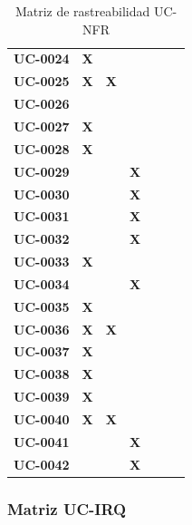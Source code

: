 \begin{table}[H]
\begin{tabular}{p{1.5cm}p{0.5cm}p{0.5cm}p{0.5cm}p{0.5cm}p{0.5cm}p{0.5cm}}
\textbf{UC-0024} & \textbf{X} &  &  &  &  &  \\
\textbf{UC-0025} & \textbf{X} & \textbf{X} &  &  &  &  \\
\textbf{UC-0026} &  &  &  &  &  &  \\
\textbf{UC-0027} & \textbf{X} &  &  &  &  &  \\
\textbf{UC-0028} & \textbf{X} &  &  &  &  &  \\
\textbf{UC-0029} &  &  & \textbf{X} &  &  &  \\
\textbf{UC-0030} &  &  & \textbf{X} &  &  &  \\
\textbf{UC-0031} &  &  & \textbf{X} &  &  &  \\
\textbf{UC-0032} &  &  & \textbf{X} &  &  &  \\
\textbf{UC-0033} & \textbf{X} &  &  &  &  &  \\
\textbf{UC-0034} &  &  & \textbf{X} &  &  &  \\
\textbf{UC-0035} & \textbf{X} &  &  &  &  &  \\
\textbf{UC-0036} & \textbf{X} & \textbf{X} &  &  &  &  \\
\textbf{UC-0037} & \textbf{X} &  &  &  &  &  \\
\textbf{UC-0038} & \textbf{X} &  &  &  &  &  \\
\textbf{UC-0039} & \textbf{X} &  &  &  &  &  \\
\textbf{UC-0040} & \textbf{X} & \textbf{X} &  &  &  &  \\
\textbf{UC-0041} &  &  & \textbf{X} &  &  &  \\
\textbf{UC-0042} &  &  & \textbf{X} &  &  &  \\
\hline
\end{tabular}
\caption{Matriz de rastreabilidad UC-NFR}
\label{fig:matriz-uc-nfr}
\end{table}


\subsubsection{Matriz UC-IRQ}

